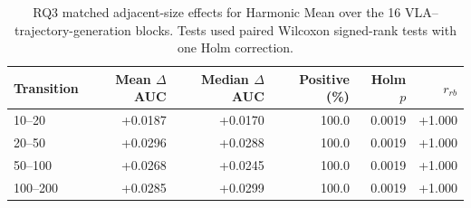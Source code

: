 \begin{table}[t]
\centering
\caption{RQ3 matched adjacent-size effects for Harmonic Mean over the 16 VLA--trajectory-generation blocks. Tests used paired Wilcoxon signed-rank tests with one Holm correction.}
\label{tab:rq3v2-adjacent-effects}
{\scriptsize
\setlength{\tabcolsep}{4pt}
\begin{tabular}{lrrrrr}
\toprule
Transition & Mean $\Delta$AUC & Median $\Delta$AUC & Positive (\%) & Holm $p$ & $r_{rb}$ \\
\midrule
10--20 & +0.0187 & +0.0170 & 100.0 & 0.0019 & +1.000 \\
20--50 & +0.0296 & +0.0288 & 100.0 & 0.0019 & +1.000 \\
50--100 & +0.0268 & +0.0245 & 100.0 & 0.0019 & +1.000 \\
100--200 & +0.0285 & +0.0299 & 100.0 & 0.0019 & +1.000 \\
\bottomrule
\end{tabular}
}
\end{table}
